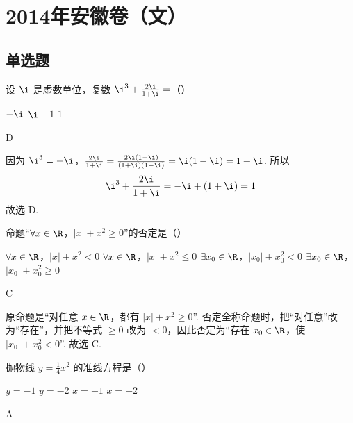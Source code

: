 \chapter{2014年安徽卷（文）}

\section{单选题}

\begin{problem}
设 \(\i\) 是虚数单位，复数 \(\i^{3} + \frac{2\i}{1+\i} =\)（\quad）

\choices
    {\(-\i\)}
    {\(\i\)}
    {\(-1\)}
    {\(1\)}

\begin{answer}
D
\end{answer}
\end{problem}

\begin{solution}
因为
\(\i^{3}=-\i\)，\(\frac{2\i}{1+\i}=\frac{2\i(1-\i)}{(1+\i)(1-\i)}=\i(1-\i)=1+\i\).
所以
\[
\i^{3}+\frac{2\i}{1+\i}=-\i+(1+\i)=1
\]
故选 D.
\end{solution}

\begin{problem}
命题“\(\forall x\in \R\)，\(|x| + x^2 \geqslant 0\)”的否定是（\quad）

\choices
    {\(\forall x\in \R\)，\(|x| + x^2 < 0\)}
    {\(\forall x\in \R\)，\(|x| + x^2 \leqslant 0\)}
    {\(\exists x_0\in \R\)，\(|x_0| + x_0^2 < 0\)}
    {\(\exists x_0\in \R\)，\(|x_0| + x_0^2 \geqslant 0\)}

\begin{answer}
C
\end{answer}
\end{problem}

\begin{solution}
原命题是“对任意 \(x\in\R\)，都有 \(|x|+x^2\geqslant0\)”. 否定全称命题时，把“对任意”改为“存在”，并把不等式 \(\geqslant0\) 改为 \(<0\)，因此否定为“存在 \(x_0\in\R\)，使 \(|x_0|+x_0^2<0\)”.
故选 C.
\end{solution}

\begin{problem}
抛物线 \(y = \frac{1}{4}x^2\) 的准线方程是（\quad）

\choices
    {\(y = -1\)}
    {\(y = -2\)}
    {\(x = -1\)}
    {\(x = -2\)}

\begin{answer}
A
\end{answer}
\end{problem}

